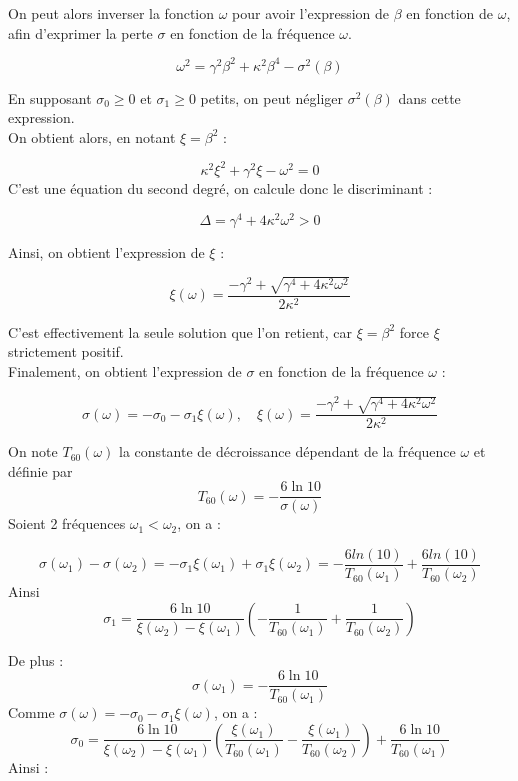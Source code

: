 \documentclass[a4,12pt]{article}
\begin{document}
	    On peut alors inverser la fonction $\omega$ pour avoir l'expression de $\beta$ en fonction de $\omega$, afin d'exprimer la perte $\sigma$ en fonction de la fréquence $\omega$.

	    \[
	      \omega^2 = \gamma^2 \beta^2 + \kappa^2 \beta^4 - \sigma^2(\beta)
	    \]

	    En supposant $\sigma_0\geqslant 0$ et $\sigma_1\geqslant 0$ petits, on peut négliger $\sigma^2(\beta)$ dans cette expression.\\
	    On obtient alors, en notant $\xi = \beta^2$ :

	    \[
	      \kappa^2 \xi^2 + \gamma^2 \xi - \omega^2 = 0
	    \]
	    C'est une équation du second degré, on calcule donc le discriminant :

	    \[
	      \Delta = \gamma^4 + 4 \kappa^2 \omega^2 > 0
	    \]

	    Ainsi, on obtient l'expression de $\xi$ :

	    \[
	      \xi(\omega) = \frac{-\gamma^2+\sqrt{\gamma^4+4\kappa^2 \omega^2}}{2\kappa^2}
	    \]

	    C'est effectivement la seule solution que l'on retient, car $\xi = \beta^2$ force $\xi$ strictement positif.\\

	    Finalement, on obtient l'expression de $\sigma$ en fonction de la fréquence $\omega$ :

	    \[
	      \sigma(\omega)=-\sigma_0-\sigma_1\xi (\omega),\quad \xi(\omega)=\frac{-\gamma^2+\sqrt{\gamma^4+4\kappa^2 \omega^2}}{2\kappa^2}
	    \]

	    On note $T_{60}(\omega)$ la constante de décroissance dépendant de la fréquence $\omega$ et définie par 
	    \[
	      T_{60}(\omega)=-\frac{6\ln 10}{\sigma(\omega)}
	    \]
	    Soient 2 fréquences $\omega_1<\omega_2$, on a :

	    \[
	      \sigma(\omega_1)-\sigma(\omega_2) = -\sigma_1 \xi(\omega_1) + \sigma_1 \xi(\omega_2)
	      = -\frac{6 ln(10)}{T_{60}(\omega_1)} + \frac{6 ln(10)}{T_{60}(\omega_2)}
	    \]
	    Ainsi \[
	      \sigma_1=\frac{6 \ln 10}{\xi(\omega_2)-\xi(\omega_1)}\left(-\frac{1}{T_{60}(\omega_1)}+\frac{1}{T_{60}(\omega_2)}\right)
	    \]

	    De plus :
	    \[
	      \sigma(\omega_1)=-\frac{6\ln 10}{T_{60}(\omega_1)}
	    \]
	    Comme $\sigma(\omega)=-\sigma_0-\sigma_1\xi (\omega)$, on a :
	    \[
	      \sigma_0 = \frac{6 \ln 10}{\xi(\omega_2)-\xi(\omega_1)}\left(\frac{\xi(\omega_1)}{T_{60}(\omega_1)}-\frac{\xi(\omega_1)}{T_{60}(\omega_2)}\right) + \frac{6\ln 10}{T_{60}(\omega_1)}
	    \]
	    Ainsi :
\end{document}
